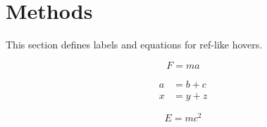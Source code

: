 \section{Methods}\label{sec:methods}
This section defines labels and equations for ref-like hovers.

\begin{equation}\label{eq:newton}
F = m a
\end{equation}

\begin{align}\label{eq:align}
a &= b + c \\
x &= y + z
\end{align}

\begin{equation}\label{eq:eqbox}
\boxed{E = mc^2}
\end{equation}
